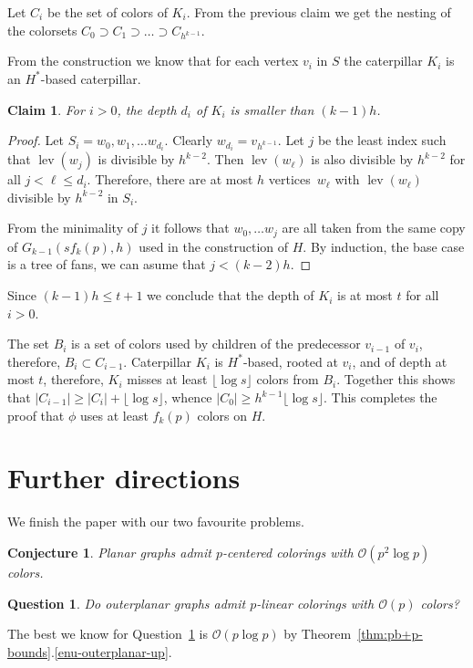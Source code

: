 \documentclass[11pt]{article}
\newtheorem{conjecture}[theorem]{Conjecture}
\newtheorem{question}[theorem]{Question}
\newtheorem*{klaim}{Claim}
\begin{document}
Let $C_i$ be the set of colors of $K_i$. From the previous claim
we get the nesting of the colorsets
$C_0\supset C_1 \supset \ldots \supset C_{h^{k-1}}$.

{}From the construction we know that for each vertex $v_i$ in $S$ the caterpillar $K_i$ is an $H^*$-based
caterpillar.
\begin{klaim}
  For $i>0$, the depth $d_i$ of $K_{i}$ is smaller than $(k-1)h$.
\end{klaim}

\begin{proof}
  Let $S_i =w_0,w_1,\ldots w_{d_i}$. Clearly $w_{d_i}=v_{h^{k-1}}$.  Let
  $j$ be the least index such that $\operatorname{lev}(w_j)$ is divisible by $h^{k-2}$.
  Then $\operatorname{lev}(w_\ell)$ is also divisible by $h^{k-2}$ for all $j < \ell \leq d_i$.
  Therefore, there are at most $h$ vertices~$w_\ell$ with $\operatorname{lev}(w_\ell)$ divisible
  by $h^{k-2}$ in $S_i$.

  {}From the minimality of $j$ it follows that $w_0,\ldots w_{j}$
  are all taken from the same copy of $G_{k-1}(s f_k(p),h)$ used in the
  construction of $H$. By induction, the base case is a tree of fans,
  we can asume that $j < (k-2)h$. 
\end{proof}

Since $(k-1)h \leq t+1$
we conclude that the depth of $K_{i}$ is at most $t$ for all
$i > 0$. 

The set $B_i$ is a set of colors used by children of the predecessor $v_{i-1}$
of $v_i$, therefore, $B_i \subset C_{i-1}$. Caterpillar $K_i$ is $H^*$-based,
rooted at $v_i$, and of depth at most $t$, therefore, $K_i$ misses at
least $\lfloor\log s\rfloor$ colors from $B_i$. Together this shows that
$|C_{i-1}| \geq |C_i|+\lfloor\log s\rfloor$, whence $|C_0|\geq h^{k-1}\lfloor\log s\rfloor$.  This
completes the proof that $\phi$ uses at least $f_k(p)$ colors
on $H$.

\section{Further directions}
We finish the paper with our two favourite problems.
\begin{conjecture}
Planar graphs admit $p$-centered colorings with $\mathcal{O}(p^2\log p)$ colors.
\end{conjecture}
\begin{question}
Do outerplanar graphs admit $p$-linear colorings with $\mathcal{O}(p)$ colors? 
\label{que:outerplanar}
\end{question}
The best we know for Question~\ref{que:outerplanar} is $\mathcal{O}(p\log p)$ by Theorem~\ref{thm:pb+p-bounds}.\ref{enu-outerplanar-up}.
\end{document}
